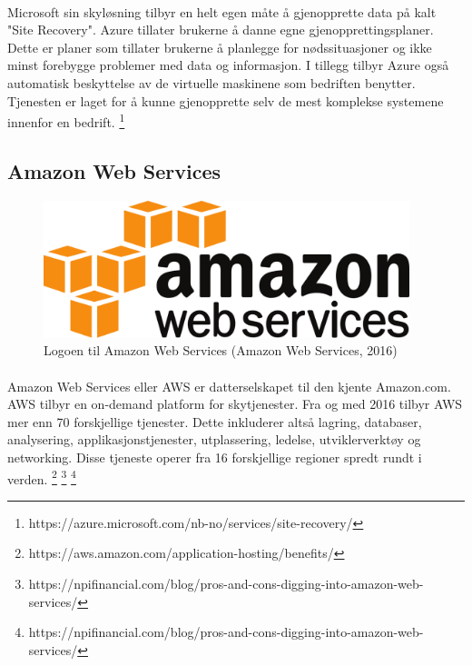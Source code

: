 \paragraph{} Microsoft sin skyløsning tilbyr en helt egen måte å gjenopprette data på kalt "Site Recovery". Azure tillater brukerne å danne egne gjenopprettingsplaner. Dette er planer som tillater brukerne å planlegge for nødssituasjoner og ikke minst forebygge problemer med data og informasjon. I tillegg tilbyr Azure også automatisk beskyttelse av de virtuelle maskinene som bedriften benytter. Tjenesten er laget for å kunne gjenopprette selv de mest komplekse systemene innenfor en bedrift.
\footnote{https://azure.microsoft.com/nb-no/services/site-recovery/}

\subsection{Amazon Web Services}
\begin{figure}[H]
\centering
\includegraphics[width=4.2in]{Bilder/AWS.png}
\caption{Logoen til Amazon Web Services (Amazon Web Services, 2016)}
\end{figure}
\paragraph{}Amazon Web Services eller AWS er datterselskapet til den kjente Amazon.com. AWS tilbyr en on-demand platform for skytjenester. Fra og med 2016 tilbyr AWS mer enn 70 forskjellige tjenester. Dette inkluderer altså lagring, databaser, analysering, applikasjonstjenester, utplassering, ledelse, utviklerverktøy og networking. Disse tjeneste operer fra 16 forskjellige regioner spredt rundt i verden.
\footnote{ https://aws.amazon.com/application-hosting/benefits/ }
\footnote{ https://npifinancial.com/blog/pros-and-cons-digging-into-amazon-web-services/ }
\footnote{ https://npifinancial.com/blog/pros-and-cons-digging-into-amazon-web-services/ }

